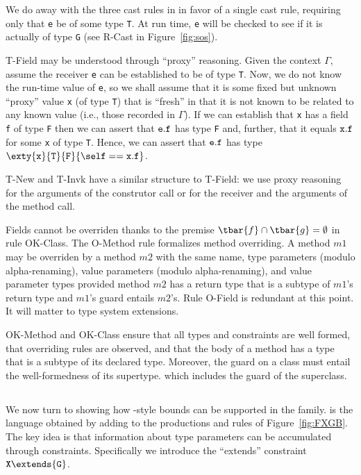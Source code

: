 We do away with the three cast rules in \FJ{} in favor of a single
cast rule, requiring only that {\tt e} be of some type {\tt T}. At run time,
{\tt e} will be checked to see if it is actually of type {\tt G} (see
{\sc R-Cast} in Figure~\ref{fig:sos}).

{\sc T-Field} may be understood through ``proxy'' reasoning.
Given the context $\Gamma$, assume the receiver {\tt e} can
be established to be of type {\tt T}. Now, we do not know the run-time
value of {\tt e}, so we shall assume that it is some fixed but unknown
``proxy'' value {\tt x} (of type {\tt T}) that is ``fresh'' in that it
is not known to be related to any known value (i.e., those recorded
in $\Gamma$).  If we can establish that {\tt x} has a field {\tt f} of
type {\tt F} then we can assert that
${\tt e}.{\tt f}$ has type {\tt F} and, further, that it equals ${\tt x}.{\tt f}$
for some {\tt x} of type {\tt T}.
Hence, we can assert that ${\tt e}.{\tt f}$ has type 
$\exty{\tt x}{\tt T}{\tt F}\{\self=={\tt x}.{\tt f}\}$.

{\sc T-New} and {\sc T-Invk} have a similar structure to {\sc T-Field}: we use
proxy reasoning for the arguments of the construtor call or for the receiver and the arguments of the method
call.

Fields cannot be overriden thanks to the premise $\tbar{f}\cap\tbar{g}=\emptyset$ in rule {\sc OK-Class}. The {\sc O-Method} rule formalizes method overriding. A method $m1$ may be overriden by a method $m2$ with the same name, type parameters (modulo alpha-renaming), value parameters (modulo alpha-renaming), and value parameter types provided method $m2$ has a return type that is a subtype of $m1$'s return type and $m1$'s guard entails $m2$'s. Rule {\sc O-Field} is redundant at this point. It will matter to type system extensions.

{\sc OK-Method} and {\sc OK-Class} ensure that all types and constraints are well formed, that overriding rules are observed, and that the body of a method has a type that is a subtype of its declared type. Moreover, the guard on a class must entail the well-formedness of its supertype. which includes the guard of the superclass.

\subsection{}
We now turn to showing how \FGJ{}-style bounds can be supported in the \FXGL{\cdot} family.
 is the language obtained by adding to \FXGL{\cdot} the productions and rules of Figure~\ref{fig:FXGB}.
The key idea is that information about type parameters can be accumulated through constraints. Specifically we introduce the ``extends'' constraint \mbox{${\tt X}\extends{\tt G}$}.

